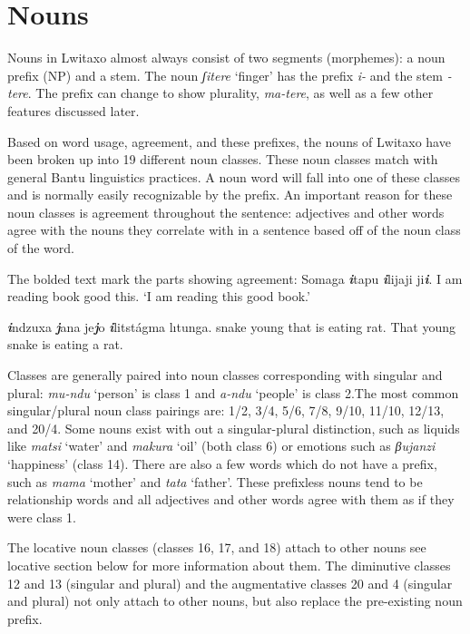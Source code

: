 \section{Nouns}
Nouns in Lwitaxo almost always consist of two segments (morphemes): a noun prefix (NP) and a stem.  The noun \emph{ʃitere} `finger' has the prefix \emph{\esh{}i-} and the stem \emph{-tere}.  The prefix can change to show plurality, \emph{ma-tere}, as well as a few other features discussed later.


Based on word usage, agreement, and these prefixes, the nouns of Lwitaxo have been broken up into 19 different noun classes.  These noun classes match with general Bantu linguistics practices.  A noun word will fall into one of these classes and is normally easily recognizable by the prefix.  An important reason for these noun classes is agreement throughout the sentence: adjectives and other words agree with the nouns they correlate with in a sentence based off of the noun class of the word.

The bolded text mark the parts showing agreement:
\gll Soma\engma{}ga \emph{\textbf{\esh{}i}}tapu \emph{\textbf{\esh{}i}}lijaji ji\emph{\textbf{\esh{}i}}.
     {I am reading} book good this.
\glt `I am reading this good book.'
\glend

\gll \emph{\textbf{i}}ndzuxa \emph{\textbf{j}}ana je\emph{\textbf{j}}o \emph{\textbf{i}}litst\'{a}\engma{}gma l\i{}t\esh{}un\engma{}ga.
     snake young that {is eating}                       rat.
\glt That young snake is eating a rat.
\glend

Classes are generally paired into noun classes corresponding with singular and plural: \emph{mu-ndu} `person' is class 1 and \emph{\beta{}a-ndu} `people' is class 2.The most common singular/plural noun class pairings are: 1/2, 3/4, 5/6, 7/8, 9/10, 11/10, 12/13, and 20/4.  Some nouns exist with out a singular-plural distinction, such as liquids like \emph{matsi} `water' and \emph{makura} `oil' (both class 6) or emotions such as \emph{βujanzi} `happiness' (class 14).  There are also a few words which do not have a prefix, such as \emph{mama} `mother' and \emph{tata} `father'.  These prefixless nouns tend to be relationship words and all adjectives and other words agree with them as if they were class 1.

The locative noun classes (classes 16, 17, and 18) attach to other nouns see locative section below for more information about them.  The diminutive classes 12 and 13 (singular and plural) and the augmentative classes 20 and 4 (singular and plural) not only attach to other nouns, but also replace the pre-existing noun prefix.

